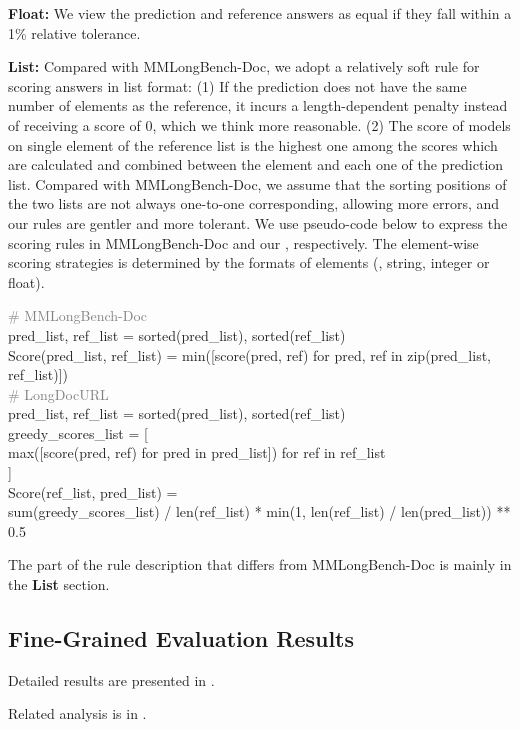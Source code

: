 \noindent\textbf{Float:} We view the prediction and reference answers as equal if they fall within a 1\% relative tolerance. 

\noindent\textbf{List:} Compared with MMLongBench-Doc, we adopt a relatively soft rule for scoring answers in list format: (1) If the prediction does not have the same number of elements as the reference, it incurs a length-dependent penalty instead of receiving a score of 0, which we think more reasonable. (2) The score of models on single element of the reference list is the highest one among the scores which are calculated and combined between the element and each one of the prediction list. Compared with MMLongBench-Doc, we assume that the sorting positions of the two lists are not always one-to-one corresponding, allowing more errors, and our rules are gentler and more tolerant. We use pseudo-code below to express the scoring rules in MMLongBench-Doc and our \benchName, respectively. The element-wise scoring strategies is determined by the formats of elements (\ie, string, integer or float).

\begin{tcolorbox}[colback=gray!5]
\small
\textcolor{gray}{\# MMLongBench-Doc} \\
pred\_list, ref\_list = sorted(pred\_list), sorted(ref\_list) \\
Score(pred\_list, ref\_list) = min([score(pred, ref) for pred, ref in zip(pred\_list, ref\_list)]) \\

\vspace{0.5em}
\textcolor{gray}{\# LongDocURL} \\
pred\_list, ref\_list = sorted(pred\_list), sorted(ref\_list) \\
greedy\_scores\_list = [ \\
\setlength{\parindent}{2em} 
\hspace{1em} max([score(pred, ref) for pred in pred\_list]) for ref in ref\_list \\
] \\
Score(ref\_list, pred\_list) = \\ 
\hspace{1em} sum(greedy\_scores\_list) / len(ref\_list) * min(1, len(ref\_list) / len(pred\_list)) ** 0.5 \\

\label{text:scoring_rules_for_list}
\end{tcolorbox}

The part of the rule description that differs from MMLongBench-Doc is mainly in the \textbf{List} section.


\subsection{Fine-Grained Evaluation Results}
\label{xsubsec:appendix_multi_dimensional_results}
Detailed results are presented in . 

\noindent Related analysis is in .

